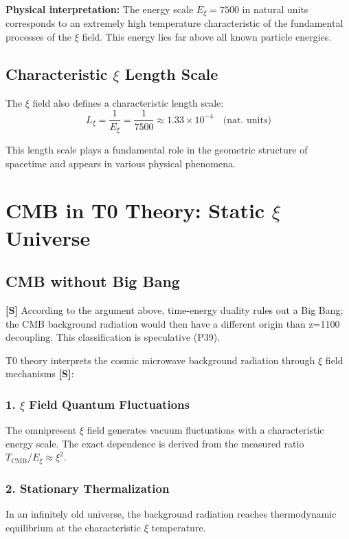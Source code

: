 	\textbf{Physical interpretation:} The energy scale $E_\xi = 7500$ in natural units corresponds to an extremely high temperature characteristic of the fundamental processes of the $\xi$ field. This energy lies far above all known particle energies.
	
	\subsection{Characteristic $\xi$ Length Scale}
	
	The $\xi$ field also defines a characteristic length scale:
	\begin{equation}
		L_\xi = \frac{1}{E_\xi} = \frac{1}{7500} \approx 1.33 \times 10^{-4} \quad \text{(nat. units)}
	\end{equation}
	
	This length scale plays a fundamental role in the geometric structure of spacetime and appears in various physical phenomena.
	
	\section{CMB in T0 Theory: Static $\xi$ Universe}
	
	\subsection{CMB without Big Bang}
	
	\begin{important}
		\textbf{[S]} According to the argument above, time-energy duality rules out a Big Bang; the CMB background radiation would then have a different origin than z=1100 decoupling. This classification is speculative (P39).
	\end{important}
	
	T0 theory interprets the cosmic microwave background radiation through $\xi$ field mechanisms \textbf{[S]}:
	
	\subsubsection{1. $\xi$ Field Quantum Fluctuations}
	The omnipresent $\xi$ field generates vacuum fluctuations with a characteristic energy scale. The exact dependence is derived from the measured ratio $T_{\text{CMB}}/E_\xi \approx \xi^2$.
	
	\subsubsection{2. Stationary Thermalization}
	In an infinitely old universe, the background radiation reaches thermodynamic equilibrium at the characteristic $\xi$ temperature.
	
